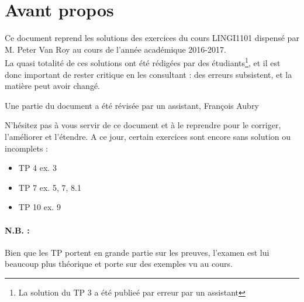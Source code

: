 \section*{Avant propos}
Ce document reprend les solutions des exercices du cours LINGI1101 dispensé par M. Peter Van Roy au cours de l'année académique 2016-2017.\\
La quasi totalité de ces solutions ont été rédigées par des étudiants\footnote{La solution du TP 3 a été publieé par erreur par un assistant}, et il est donc important de rester critique en les consultant : des erreurs subsistent, et la matière peut avoir changé.

Une partie du document a été révisée par un assistant, François Aubry

N'hésitez pas à vous servir de ce document et à le reprendre pour le corriger, l'améliorer et l'étendre.
A ce jour, certain exercices sont encore sans solution ou incomplets : 
\begin{itemize}
	\item TP 4 ex. 3
	\item TP 7 ex. 5, 7, 8.1
	\item TP 10 ex. 9
\end{itemize}

\paragraph{\large{N.B. :}} Bien que les TP portent en grande partie sur les preuves, l'examen est lui beaucoup plus théorique et porte sur des exemples vu au cours.